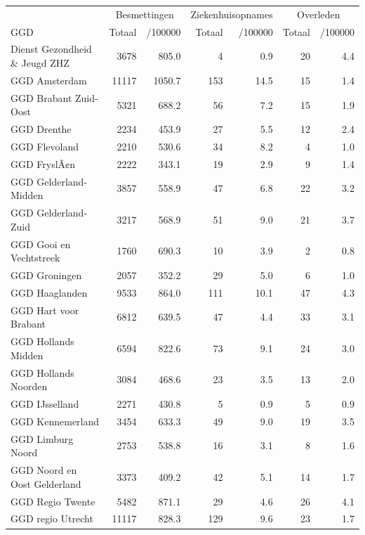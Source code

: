 \documentclass[
  english,
  man,floatsintext]{apa6}
\begin{document}
\begin{table}[H]
\centering\begingroup\fontsize{10}{12}\selectfont

\begin{threeparttable}
\begin{tabular}{lrrrrrr}
\toprule
\multicolumn{1}{c}{ } & \multicolumn{2}{c}{Besmettingen} & \multicolumn{2}{c}{Ziekenhuisopnames} & \multicolumn{2}{c}{Overleden} \\
\cmidrule(l{3pt}r{3pt}){2-3} \cmidrule(l{3pt}r{3pt}){4-5} \cmidrule(l{3pt}r{3pt}){6-7}
GGD & Totaal & /100000 & Totaal & /100000 & Totaal & /100000\\
\midrule
Dienst Gezondheid \& Jeugd ZHZ & 3678 & 805.0 & 4 & 0.9 & 20 & 4.4\\
GGD Amsterdam & 11117 & 1050.7 & 153 & 14.5 & 15 & 1.4\\
GGD Brabant Zuid-Oost & 5321 & 688.2 & 56 & 7.2 & 15 & 1.9\\
GGD Drenthe & 2234 & 453.9 & 27 & 5.5 & 12 & 2.4\\
GGD Flevoland & 2210 & 530.6 & 34 & 8.2 & 4 & 1.0\\
GGD FryslÃ¢n & 2222 & 343.1 & 19 & 2.9 & 9 & 1.4\\
GGD Gelderland-Midden & 3857 & 558.9 & 47 & 6.8 & 22 & 3.2\\
GGD Gelderland-Zuid & 3217 & 568.9 & 51 & 9.0 & 21 & 3.7\\
GGD Gooi en Vechtstreek & 1760 & 690.3 & 10 & 3.9 & 2 & 0.8\\
GGD Groningen & 2057 & 352.2 & 29 & 5.0 & 6 & 1.0\\
GGD Haaglanden & 9533 & 864.0 & 111 & 10.1 & 47 & 4.3\\
GGD Hart voor Brabant & 6812 & 639.5 & 47 & 4.4 & 33 & 3.1\\
GGD Hollands Midden & 6594 & 822.6 & 73 & 9.1 & 24 & 3.0\\
GGD Hollands Noorden & 3084 & 468.6 & 23 & 3.5 & 13 & 2.0\\
GGD IJsselland & 2271 & 430.8 & 5 & 0.9 & 5 & 0.9\\
GGD Kennemerland & 3454 & 633.3 & 49 & 9.0 & 19 & 3.5\\
GGD Limburg Noord & 2753 & 538.8 & 16 & 3.1 & 8 & 1.6\\
GGD Noord en Oost Gelderland & 3373 & 409.2 & 42 & 5.1 & 14 & 1.7\\
GGD Regio Twente & 5482 & 871.1 & 29 & 4.6 & 26 & 4.1\\
GGD regio Utrecht & 11117 & 828.3 & 129 & 9.6 & 23 & 1.7\\

\end{tabular}
\end{threeparttable}
\end{table}
\end{document}
